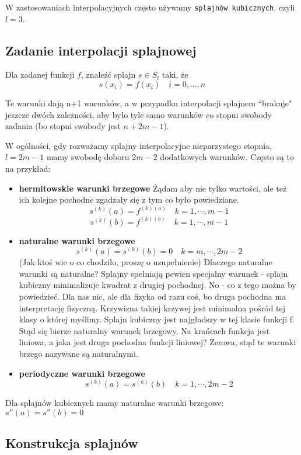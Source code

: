 \documentclass[hidelinks,a4paper,fleqn,oneside]{book}
\begin{document}
W zastosowaniach interpolacyjnych często używamy \texttt{splajnów kubicznych}, czyli $l=3$.

\subsection{Zadanie interpolacji splajnowej} Dla zadanej funkcji $f$, znaleźć splajn $s \in S_l$ taki, że \[s(x_i) = f(x_i)\quad i=0, ..., n\]

Te warunki dają n+1 warunków, a w przypadku interpolacji splajnem ``brakuje" jeszcze dwóch zależności, aby było tyle samo warunków co stopni swobody zadania (bo stopni swobody jest $n+2m-1$).

W ogólności, gdy rozważamy splajny interpolacyjne nieparzystego stopnia, $l=2m-1$ mamy swobodę doboru $2m-2$ dodatkowych warunków. Często są to na przykład:

\begin{itemize}
	\item \textbf{hermitowskie warunki brzegowe}
	Żądam aby nie tylko wartości, ale też ich kolejne pochodne zgadzały się z tym co było powiedziane.
	\[
		s^{(k)}(a) = f^{(k)(a)} \quad k = 1, \cdots, m-1
	\]
	\[
		s^{(k)}(b) = f^{(k)(b)} \quad k = 1, \cdots, m-1
	\]
	
	\item \textbf{naturalne warunki brzegowe}
	\[
		s^{(k)}(a) = s^{(k)}(b) = 0 \quad k = m, \cdots, 2m-2
	\]
	(Jak ktoś wie o co chodziło, proszę o uzupełnienie) Dlaczego naturalne warunki są naturalne? Splajny spełniają pewien specjalny warunek - splajn kubiczny minimalizuje kwadrat z drugiej pochodnej. No - co z tego można by powiedzieć. Dla nas nic, ale dla fizyka od razu coś, bo druga pochodna ma interpretację fizyczną. Krzywizna takiej krzywej jest minimalna pośród tej klasy o której myślimy. Splajn kubiczny jest najgładszy w tej klasie funkcji f. Stąd się bierze naturalny warunek brzegowy. Na krańcach funkcja jest liniowa, a jaka jest druga pochodna funkcji liniowej? Zerowa, stąd te warunki brzego nazywane są naturalnymi.
	
	\item \textbf{periodyczne warunki brzegowe}
	\[
		s^{(k)}(a) = s^{(k)}(b) \quad k=1, \cdots, 2m-2
	\]
\end{itemize}

Dla splajnów kubicznych mamy naturalne warunki brzegowe: $s''(a) = s''(b) = 0$

\subsection{Konstrukcja splajnów}
\end{document}
